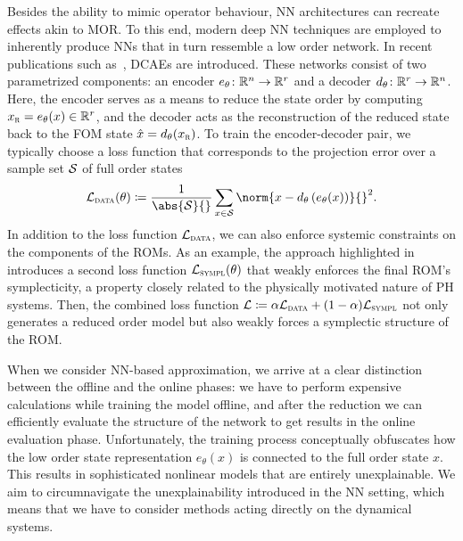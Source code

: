 Besides the ability to mimic operator behaviour, \ac{NN} architectures can recreate effects akin to \ac{MOR}.
To this end, modern deep \ac{NN} techniques are employed to inherently produce \acp{NN} that in turn ressemble a low order network.
In recent publications such as~\cite{Lee2020, Salvador2021, Benner2022, Kim2022, Buchfink2023}, \acp{DCAE} are introduced.
These networks consist of two parametrized components: an encoder $e_\theta \colon \mathbb{R}^n \to \mathbb{R}^r$ and a decoder $d_\theta \colon \mathbb{R}^r \to \mathbb{R}^n$.
Here, the encoder serves as a means to reduce the state order by computing $x_{\textnormal{\scshape r}} = e_\theta(x) \in \mathbb{R}^r$, and the decoder acts as the reconstruction of the reduced state back to the \ac{FOM} state $\hat{x} = d_\theta(x_{\textnormal{\scshape r}})$.
To train the encoder-decoder pair, we typically choose a loss function that corresponds to the projection error over a sample set $\mathcal{S}$ of full order states
\begin{equation}\label{eq:reduction-loss}
    \mcl{L}_{\msc{data}}(\theta) \coloneqq \frac{1}{\abs{\mcl{S}}{}} \sum\limits_{x \in \mcl{S}} \norm{x - d_\theta\left( e_\theta(x) \right)}{}^2.
\end{equation}
In addition to the loss function $\mathcal{L}_{\textnormal{\scshape data}}$, we can also enforce systemic constraints on the components of the \acp{ROM}.
As an example, the approach highlighted in~\cite{Buchfink2023} introduces a second loss function $\mathcal{L}_{\textnormal{\scshape sympl}}(\theta)$ that weakly enforces the final \ac{ROM}'s symplecticity, a property closely related to the physically motivated nature of \ac{PH} systems.
Then, the combined loss function $\mathcal{L} \coloneqq \alpha \mathcal{L}_{\textnormal{\scshape data}} + (1 - \alpha) \mathcal{L}_{\textnormal{\scshape sympl}}$ not only generates a reduced order model but also weakly forces a symplectic structure of the \ac{ROM}.

When we consider \ac{NN}-based approximation, we arrive at a clear distinction between the offline and the online phases: we have to perform expensive calculations while training the model offline, and after the reduction we can efficiently evaluate the structure of the network to get results in the online evaluation phase.
Unfortunately, the training process conceptually obfuscates how the low order state representation $e_\theta(x)$ is connected to the full order state $x$.
This results in sophisticated nonlinear models that are entirely unexplainable.
We aim to circumnavigate the unexplainability introduced in the \ac{NN} setting, which means that we have to consider methods acting directly on the dynamical systems.
